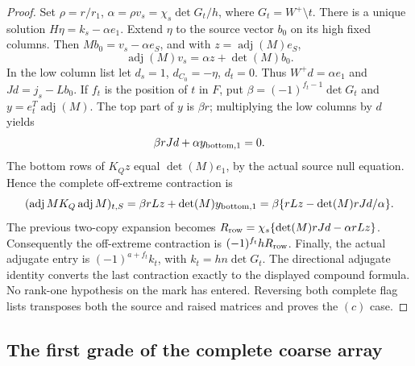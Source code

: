 \documentclass[11pt,a4paper]{amsart}
\numberwithin{equation}{section}
\theoremstyle{plain}
\theoremstyle{definition}
\begin{document}
\begin{proof}
Set \(\rho=r/r_1\),
\(\alpha=\rho v_s=\chi_s\det G_t/h\), where \(G_t=W^+\setminus t\).
There is a unique solution \(H\eta=k_s-\alpha e_1\).
Extend \(\eta\) to the source vector \(b_0\) on its high fixed columns.
Then
\(Mb_0=v_s-\alpha e_S\), and with
\(z=\operatorname{adj}(M)e_S\),
\[
 \operatorname{adj}(M)v_s=\alpha z+\det(M)b_0.
\]
In the low column list let \(d_s=1\), \(d_{C_0}=-\eta\), \(d_t=0\).
Thus \(W^+d=\alpha e_1\) and \(Jd=j_s-Lb_0\).
If \(f_t\) is the position of \(t\) in \(F\), put
\(\beta=(-1)^{f_t-1}\det G_t\) and
\(y=e_t^T\operatorname{adj}(M)\).
The top part of \(y\) is \(\beta r\); multiplying the low columns by
\(d\) yields
\[
 \beta rJd+\alpha y_{\rm bottom,1}=0.
\]
The bottom rows of \(K_Qz\) equal \(\det(M)e_1\), by the actual source
null equation.  Hence the complete off-extreme contraction is
\[
 ( \operatorname{adj}M K_Q\operatorname{adj}M)_{t,S}
 =\beta rLz+\det(M)y_{\rm bottom,1}
 =\beta\{rLz-\det(M)rJd/\alpha\}.
\]
The previous two-copy expansion becomes
\(R_{\rm row}=\chi_s\{\det(M)rJd-\alpha rLz\}\).
Consequently the off-extreme contraction is
\((-1)^{f_t}hR_{\rm row}\).
Finally, the actual adjugate entry is
\((-1)^{a+f_t}k_t\), with \(k_t=hn\det G_t\).
The directional adjugate identity converts the last contraction exactly
to the displayed compound formula.  No rank-one hypothesis on the mark
has entered.  Reversing both complete flag lists transposes both the
source and raised matrices and proves the \((c)\) case.
\end{proof}

\subsection{The first grade of the complete coarse array}
\end{document}
